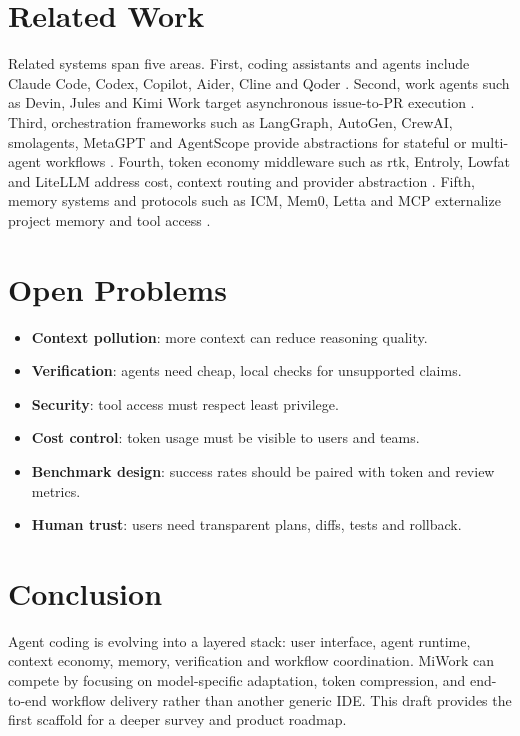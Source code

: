 \documentclass[11pt]{article}
\begin{document}
\section{Related Work}
Related systems span five areas. First, coding assistants and agents include Claude Code, Codex, Copilot, Aider, Cline and Qoder \cite{anthropic_claude_code,aider,cline,qoder,github_copilot}. Second, work agents such as Devin, Jules and Kimi Work target asynchronous issue-to-PR execution \cite{devin,jules,kimi_work}. Third, orchestration frameworks such as LangGraph, AutoGen, CrewAI, smolagents, MetaGPT and AgentScope provide abstractions for stateful or multi-agent workflows \cite{langgraph,autogen,crewai,smolagents,metagpt,agentscope}. Fourth, token economy middleware such as rtk, Entroly, Lowfat and LiteLLM address cost, context routing and provider abstraction \cite{rtk,entroly,lowfat,litellm}. Fifth, memory systems and protocols such as ICM, Mem0, Letta and MCP externalize project memory and tool access \cite{icm,mem0,letta,mcp}.

\section{Open Problems}
\begin{itemize}[leftmargin=*]
  \item \textbf{Context pollution}: more context can reduce reasoning quality.
  \item \textbf{Verification}: agents need cheap, local checks for unsupported claims.
  \item \textbf{Security}: tool access must respect least privilege.
  \item \textbf{Cost control}: token usage must be visible to users and teams.
  \item \textbf{Benchmark design}: success rates should be paired with token and review metrics.
  \item \textbf{Human trust}: users need transparent plans, diffs, tests and rollback.
\end{itemize}

\section{Conclusion}
Agent coding is evolving into a layered stack: user interface, agent runtime, context economy, memory, verification and workflow coordination. MiWork can compete by focusing on model-specific adaptation, token compression, and end-to-end workflow delivery rather than another generic IDE. This draft provides the first scaffold for a deeper survey and product roadmap.



\end{document}
